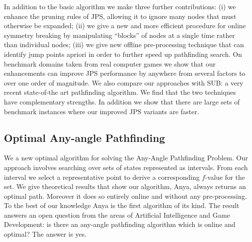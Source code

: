 In addition to the basic algorithm we make three further contributions: (i) we
enhance the pruning rules of JPS, allowing it to ignore many nodes that must
otherwise be expanded; (ii) we give a new and more efficient procedure for
online symmetry breaking by manipulating ``blocks'' of nodes at a single time
rather than individual nodes; (iii) we give new offline pre-processing
technique that can identify jump points apriori in order to further speed up
pathfinding search.
On benchmark domains taken from real computer games we show that our
enhancements can improve JPS performance by anywhere from several factors to
over one order of magnitude. We also compare our approaches with SUB: a very
recent state-of-the art pathfinding algorithm. We find that the two techniques
have complementary strengths. In addition we show that there are large 
sets of benchmark instances where our improved JPS variants are faster.

\subsection{Optimal Any-angle Pathfinding}
\label{cha::intro::contributions::anya}
We a new optimal algorithm for solving the Any-Angle Pathfinding Problem.
Our approach involves searching over sets of states
represented as intervals. From each interval we select a representative point
to derive a corresponding $f$-value for the set.  We give theoretical results
that show our algorithm, Anya, always returns an optimal path. Moreover it
does so entirely online and without any pre-processing. To the best of our
knowledge Anya is the first algorithm of its kind.  The result answers an 
open question from the areas of Artificial Intelligence and Game Development: 
is there an any-angle pathfinding algorithm which is online and optimal?
The answer is yes.

